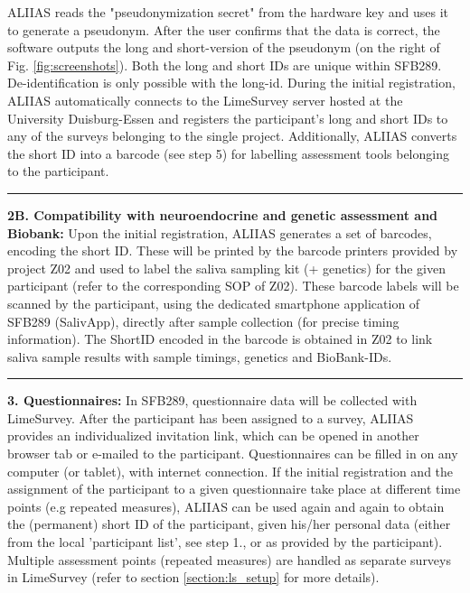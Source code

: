 ALIIAS reads the "pseudonymization secret" from the hardware key and uses it to generate a pseudonym. After the user confirms that the data is correct, the software outputs the long and short-version of the pseudonym (on the right of Fig. \ref{fig:screenshots}). Both the long and short IDs are unique within SFB289. De-identification is only possible with the long-id. During the initial registration, ALIIAS automatically connects to the LimeSurvey server hosted at the University Duisburg-Essen and registers the participant's long and short IDs to any of the surveys belonging to the single project. Additionally, ALIIAS converts the short ID into a barcode (see step 5) for labelling assessment tools belonging to the participant.

\par\noindent\rule{\textwidth\color{pniblue}}{0.4pt} 
\textbf{2B. Compatibility with neuroendocrine and genetic assessment and Biobank:} Upon the initial registration, ALIIAS generates a set of barcodes, encoding the short ID. These will be printed by the barcode printers provided by project Z02 and used to label the saliva sampling kit (+ genetics) for the given participant (refer to the corresponding SOP of Z02). These barcode labels will be scanned by the participant, using the dedicated smartphone application of SFB289 (SalivApp), directly after sample collection (for precise timing information). The ShortID encoded in the barcode is obtained in Z02 to link saliva sample results with sample timings, genetics and BioBank-IDs.

\par\noindent\rule{\textwidth\color{pniblue}}{0.4pt}
\textbf{3. Questionnaires:}
 In SFB289, questionnaire data will be collected with LimeSurvey. After the participant has been assigned to a survey, ALIIAS provides an individualized invitation link, which can be opened in another browser tab or e-mailed to the participant. Questionnaires can be filled in on any computer (or tablet), with internet connection. 
 If the initial registration and the assignment of the participant to a given questionnaire take place at different time points (e.g repeated measures), ALIIAS can be used again and again to obtain the (permanent) short ID of the participant, given his/her personal data (either from the local 'participant list', see step 1., or as provided by the participant).
 Multiple assessment points (repeated measures) are handled as separate surveys in LimeSurvey (refer to section \ref{section:ls_setup} for more details).
 
